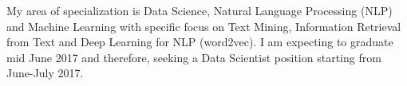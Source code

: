 
My area of specialization is Data Science, Natural Language Processing (NLP) and Machine Learning with specific focus 
on Text Mining, Information Retrieval from Text and Deep Learning for NLP (word2vec).
I am expecting to graduate mid June 2017 and therefore, seeking a Data Scientist position 
starting from June-July 2017. 
